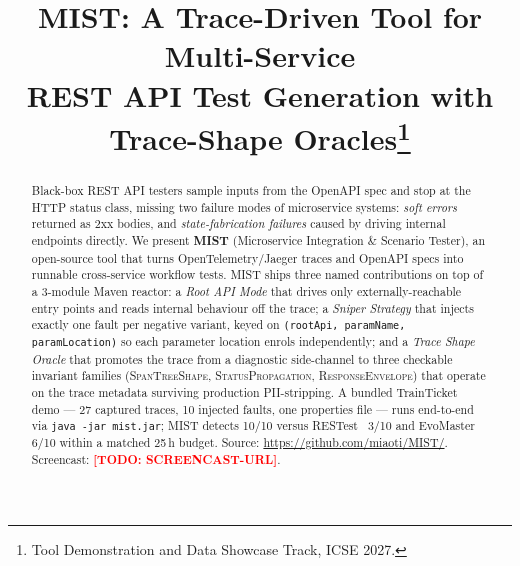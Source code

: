 \documentclass[10pt,conference]{IEEEtran}
\newcommand{\todo}[1]{\textcolor{red}{\textbf{[TODO: #1]}}}
\begin{document}
\title{MIST: A Trace-Driven Tool for Multi-Service\\REST API Test Generation with Trace-Shape Oracles\thanks{Tool Demonstration and Data Showcase Track, ICSE 2027.}}

\author{%
}

\maketitle

\begin{abstract}
Black-box REST API testers sample inputs from the OpenAPI spec and stop at the HTTP status class, missing two failure modes of microservice systems: \emph{soft errors} returned as 2xx bodies, and \emph{state-fabrication failures} caused by driving internal endpoints directly. We present \textbf{MIST} (Microservice Integration \& Scenario Tester), an open-source tool that turns OpenTelemetry/Jaeger traces and OpenAPI specs into runnable cross-service workflow tests. MIST ships three named contributions on top of a 3-module Maven reactor: a \emph{Root API Mode} that drives only externally-reachable entry points and reads internal behaviour off the trace; a \emph{Sniper Strategy} that injects exactly one fault per negative variant, keyed on \texttt{(rootApi, paramName, paramLocation)} so each parameter location enrols independently; and a \emph{Trace Shape Oracle} that promotes the trace from a diagnostic side-channel to three checkable invariant families (\textsc{SpanTreeShape}, \textsc{StatusPropagation}, \textsc{ResponseEnvelope}) that operate on the trace metadata surviving production PII-stripping. A bundled TrainTicket~\cite{Zhou2021TrainTicket} demo --- 27 captured traces, 10 injected faults, one properties file --- runs end-to-end via \texttt{java -jar mist.jar}; MIST detects 10/10 versus RESTest~\cite{MartinLopez2021RESTest} 3/10 and EvoMaster~\cite{Arcuri2019EvoMasterTOSEM} 6/10 within a matched 25\,h budget. Source: \url{https://github.com/miaoti/MIST/}. Screencast: \todo{SCREENCAST-URL}.
\end{abstract}
\end{document}
